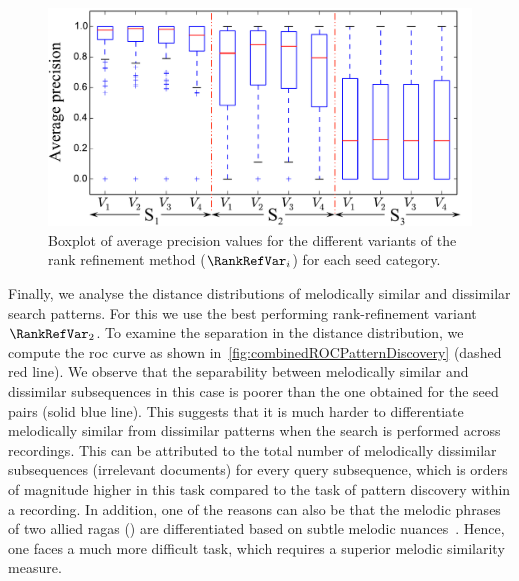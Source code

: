 \begin{figure}
	\begin{center}
		\includegraphics[width=\figSizeNinety]{ch06_patterns/figures/discovery/boxPlot.pdf}
	\end{center}
	\caption[Boxplot of average precision values for the different variants of the rank refinement method]{Boxplot of average precision values for the different variants of the rank refinement method ($\RankRefVar_i$) for each seed category.}
	\label{fig:boxPlotMAPPatternDiscovery}
\end{figure}


Finally, we analyse the distance distributions of melodically similar and dissimilar search patterns. For this we use the best performing rank-refinement variant $\RankRefVar_2$. To examine the separation in the distance distribution, we compute the \acrshort{roc} curve as shown in~\ref{fig:combinedROCPatternDiscovery} (dashed red line). We observe that the separability between melodically similar and dissimilar subsequences in this case is poorer than the one obtained for the seed pairs (solid blue line). This suggests that it is much harder to differentiate melodically similar from dissimilar patterns when the search is performed across recordings. This can be attributed to the total number of melodically dissimilar subsequences (irrelevant documents) for every query subsequence, which is orders of magnitude higher in this task compared to the task of pattern discovery within a recording. In addition, one of the reasons can also be that the melodic phrases of two allied \glspl{raga} () are differentiated based on subtle melodic nuances~\citep{Viswanathan2004}. Hence, one faces a much more difficult task, which requires a superior melodic similarity measure.%

